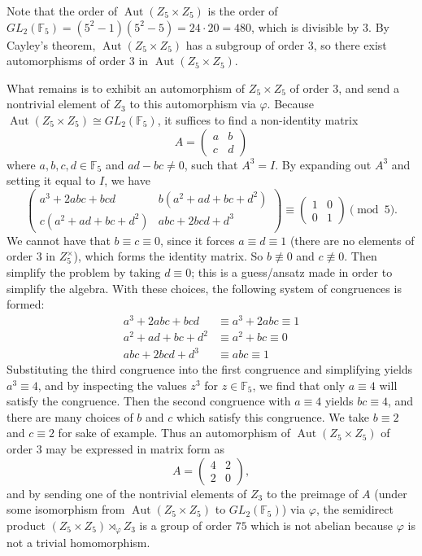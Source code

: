 \documentclass[11pt]{article}
\DeclareMathOperator\Aut{Aut}
\begin{document}
\begin{enumerate}
    Note that the order of $\Aut(Z_5\times Z_5)$ is the order of $GL_2(\mathbb{F}_5) = (5^2- 1)(5^2-5) = 24\cdot 20 = 480$, which is divisible by $3$. By Cayley's theorem, $\Aut(Z_5\times Z_5)$ has a subgroup of order $3$, so there exist automorphisms of order $3$ in $\Aut(Z_5\times Z_5)$.
    
    What remains is to exhibit an automorphism of $Z_5\times Z_5$ of order $3$, and send a nontrivial element of $Z_3$ to this automorphism via $\varphi$. Because $\Aut(Z_5\times Z_5) \cong GL_2(\mathbb{F}_5)$, it suffices to find a non-identity matrix \[A = \begin{pmatrix}
      a & b \\ c & d
    \end{pmatrix}\] where $a,b,c,d\in \mathbb{F}_5$ and $ad-bc\neq 0$, such that $A^3 = I$. By expanding out $A^3$ and setting it equal to $I$, we have \[\begin{pmatrix}
      a^3 + 2 a b c + b c d & b (a^2 + a d + b c + d^2) \\
      c (a^2 + a d + b c + d^2) & a b c + 2 b c d + d^3
    \end{pmatrix} \equiv \begin{pmatrix}
      1 & 0 \\ 0 & 1
    \end{pmatrix}\pmod{5}.\] We cannot have that $b\equiv c \equiv 0$, since it forces $a\equiv d\equiv 1$ (there are no elements of order $3$ in $Z_5^{\times}$), which forms the identity matrix. So $b\not\equiv 0$ and $c\not\equiv 0$. Then simplify the problem by taking $d\equiv 0$; this is a guess/ansatz made in order to simplify the algebra. With these choices, the following system of congruences is formed: \begin{align*}
      a^3 + 2 a b c + b c d &\equiv \boxed{a^3+ 2abc \equiv 1}\\
      a^2 + a d + b c + d^2 &\equiv \boxed{a^2+bc \equiv 0}\\
      a b c + 2 b c d + d^3 &\equiv \boxed{abc \equiv 1}
    \end{align*} Substituting the third congruence into the first congruence and simplifying yields $a^3 \equiv 4$, and by inspecting the values $z^3$ for $z\in \mathbb{F}_5$, we find that only $a\equiv 4$ will satisfy the congruence. Then the second congruence with $a\equiv 4$ yields $bc\equiv 4$, and there are many choices of $b$ and $c$ which satisfy this congruence. We take $b\equiv 2$ and $c\equiv 2$ for sake of example. Thus an automorphism of $\Aut(Z_5\times Z_5)$ of order $3$ may be expressed in matrix form as \[A = \begin{pmatrix}
      4 & 2 \\ 2 & 0
    \end{pmatrix},\] and by sending one of the nontrivial elements of $Z_3$ to the preimage of $A$ (under some isomorphism from $\Aut(Z_5\times Z_5)$ to $GL_2(\mathbb{F}_5)$) via $\varphi$, the semidirect product $(Z_5\times Z_5)\rtimes_{\varphi} Z_3$ is a group of order $75$ which is not abelian because $\varphi$ is not a trivial homomorphism.


\end{enumerate}
\end{document}
